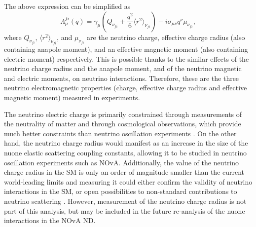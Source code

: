 The above expression can be simplified \cite{NeutrinoPropertiesSnowmass2022.pdf} as
\begin{equation}
\Lambda^{fi}_{\mu}\left(q\right)=\gamma_{\mu}\left(Q_{\nu_{fi}}+\frac{q^2}{6}\langle r^2\rangle_{\nu_{fi}}\right)-i\sigma_{\mu\nu}q^{\nu}\mu_{\nu_{fi}},
\end{equation}
where $Q_{\nu_{fi}}$, $\langle r^2\rangle_{\nu_{fi}}$, and $\mu_{\nu_{fi}}$ are the neutrino charge, effective charge radius (also containing anapole moment), and an effective magnetic moment (also containing electric moment) respectively. This is possible thanks to the similar effects of the neutrino charge radius and the anapole moment, and of the neutrino magnetic and electric moments, on neutrino interactions. Therefore, these are the three neutrino electromagnetic properties (charge, effective charge radius and effective magnetic moment) measured in experiments.

The neutrino electric charge is primarily constrained through measurements of the neutrality of matter and through cosmological observations, which provide much better constraints than neutrino oscillation experiments \cite{nuElmagInt2015.pdf}. On the other hand, the neutrino charge radius would manifest as an increase in the size of the \gls{nuone} elastic scattering coupling constants, allowing it to be studied in neutrino oscillation experiments such as \gls{NOvA}. Additionally, the value of the neutrino charge radius in the \gls{SM} is only an order of magnitude smaller than the current world-leading limits \cite{PDG.pdf} and measuring it could either confirm the validity of neutrino interactions in the \gls{SM}, or open possibilities to non-standard contributions to neutrino scattering \cite{nuElmagInt2015.pdf}. However, measurement of the neutrino charge radius is not part of this analysis, but may be included in the future re-analysis of the \gls{nuone} interactions in the \gls{NOvA} \gls{ND}.


